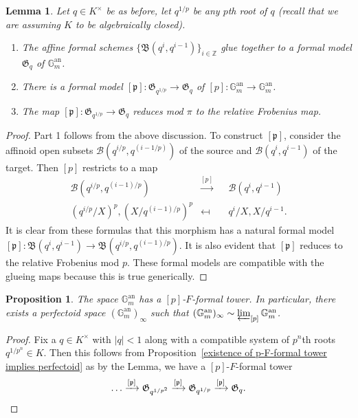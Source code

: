 \documentclass[10pt,oneside]{amsart}
\newtheorem{lemma}[theorem]{Lemma}
\newtheorem{proposition}[theorem]{Proposition}
\theoremstyle{definition}
\begin{document}
	\begin{lemma}\label{formal model of torus}
		Let $q\in K^\times$ be as before, let $q^{1/p}$ be any $p$th root of $q$ (recall that we are assuming $K$ to be algebraically closed).
		\begin{enumerate} 
		\item 
		The affine formal schemes $\{\mathfrak B(q^i,q^{i-1})\}_{i\in\mathbb Z}$ glue together to a formal model $\mathfrak G_q$ of $\mathbb G_m^{\operatorname{an}}$.
		\item There is a formal model $[\mathfrak p]: \mathfrak G_{q^{1/p}}\rightarrow  \mathfrak G_q$ of $[p]:\mathbb G_m^{\operatorname{an}}\rightarrow \mathbb G_m^{\operatorname{an}}$.
		\item The map $[\mathfrak p]: \mathfrak G_{q^{1/p}}\rightarrow  \mathfrak G_q$ reduces mod $\pi$ to the relative Frobenius map.
		\end{enumerate}
	\end{lemma}
\begin{proof}
	Part 1 follows from the above discussion. To construct $[\mathfrak p]$, consider the affinoid open subsets $\mathcal B(q^{i/p},q^{(i-1/p)})$ of the source and  $\mathcal B(q^i,q^{i-1})$ of the target. Then $[p]$ restricts to a map
	\begin{equation}
	\begin{alignedat}{2} \label{torus explicit [p] map 1}
	\mathcal B(q^{i/p},q^{(i-1)/p})&\xrightarrow{[p]}&&\mathcal B(q^i,q^{i-1}) \\
(q^{i/p}/X)^p, (X/q^{(i-1)/p})^p&\mapsfrom&& 	q^i/X, X/q^{i-1}.
	\end{alignedat}
	\end{equation}
	It is clear from these formulas that this morphism has a natural formal model  $[\mathfrak p]:\mathfrak B(q^i,q^{i-1})\to \mathfrak B(q^{i/p},q^{(i-1)/p})$. It is also evident that $[\mathfrak p]$ reduces to the relative Frobenius mod $p$. 
	These formal models are compatible with the glueing maps because this is true generically.
	\end{proof}
	\begin{proposition}
		The space $\mathbb G_m^{\operatorname{an}}$ has a $[p]$-$F$-formal tower. In particular, there exists a perfectoid space $(\mathbb G_m^{\operatorname{an}})_\infty$ such that $(\mathbb G_m^{\operatorname{an}})_\infty \sim \varprojlim_{[p]} \mathbb G_m^{\operatorname{an}}$.
	\end{proposition}
	\begin{proof}
		Fix a $q\in K^\times$ with $|q|<1$ along with a compatible system of $p^n$th roots $q^{1/p^n}\in K$. Then this follows from  Proposition~\ref{existence of p-F-formal tower implies perfectoid} as by the Lemma, we have a $[p]$-$F$-formal tower
		\[\dots \xrightarrow{[\mathfrak p]} \mathfrak G_{q^{1/p^2}}\xrightarrow{[\mathfrak p]} \mathfrak G_{q^{1/p}}\xrightarrow{[\mathfrak p]} \mathfrak G_q.\qedhere \]
	\end{proof}
	
\end{document}

